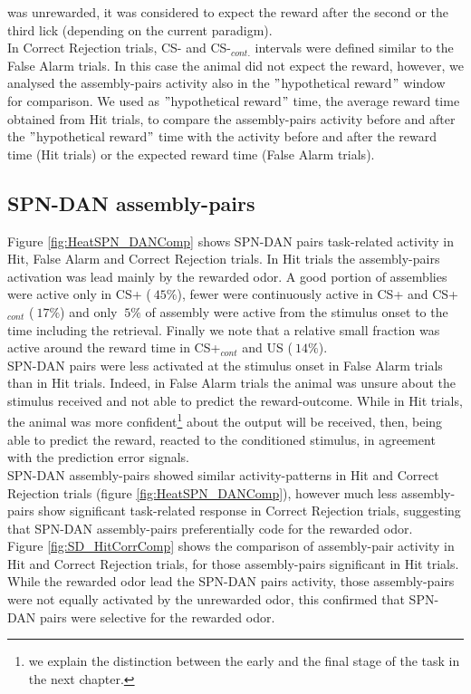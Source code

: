was unrewarded, it was considered to expect the reward after the second or the third lick (depending on the current paradigm).\\In Correct Rejection trials, CS- and CS-$_{cont.}$ intervals were defined similar to the False Alarm trials. In this case the animal did not expect the reward, however, we analysed the assembly-pairs activity also in the $"$hypothetical reward$"$ window for comparison. We used as $"$hypothetical reward$"$ time, the average reward time obtained from Hit trials, to compare the assembly-pairs activity before and after the $"$hypothetical reward$"$ time with the activity before and after the reward time (Hit trials) or the expected reward time (False Alarm trials).
\subsection{SPN-DAN assembly-pairs}
Figure \ref{fig:HeatSPN_DANComp} shows SPN-DAN pairs task-related activity in Hit, False Alarm and Correct Rejection trials. In Hit trials the assembly-pairs activation was lead mainly by the rewarded odor. A good portion of assemblies were active only in CS+ ($~ 45\%$), fewer were continuously active in CS+ and CS+$_{cont}$ ($~17\%$) and only $~5\%$ of assembly were active from the stimulus onset to the time including the retrieval. Finally we note that a relative small fraction was active around the reward time in CS+$_{cont}$ and US ($~ 14\%$).\\SPN-DAN pairs were less activated at the stimulus onset in False Alarm trials than in Hit trials. Indeed, in False Alarm trials the animal was unsure about the stimulus received and not able to predict the reward-outcome. While in Hit trials, the animal was more confident\footnote{we explain the distinction between the early and the final stage of the task in the next chapter.} about the output will be received, then, being able to predict the reward, reacted to the conditioned stimulus, in agreement with the prediction error signals.\\
SPN-DAN assembly-pairs showed similar activity-patterns in Hit and Correct Rejection trials (figure \ref{fig:HeatSPN_DANComp}), however much less assembly-pairs show significant task-related response in Correct Rejection trials, suggesting that SPN-DAN assembly-pairs preferentially code for the rewarded odor.\\Figure \ref{fig:SD_HitCorrComp} shows the comparison of assembly-pair activity in Hit and Correct Rejection trials, for those assembly-pairs significant in Hit trials. While the rewarded odor lead the SPN-DAN pairs activity, those assembly-pairs were not equally activated by the unrewarded odor, this confirmed that SPN-DAN pairs were selective for the rewarded odor.
